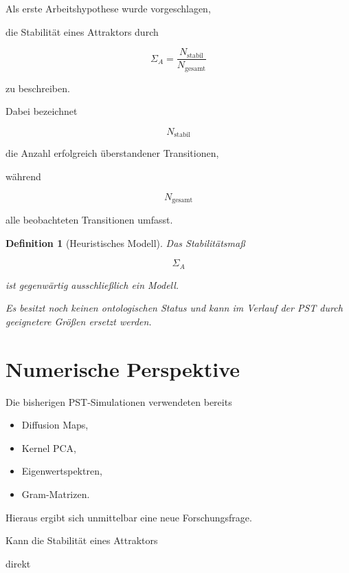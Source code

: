 \documentclass[11pt,a4paper]{article}
\newtheorem{definition}{Definition}
\begin{document}
Als erste Arbeitshypothese wurde vorgeschlagen,

die Stabilität eines Attraktors durch

\[
\Sigma_A
=
\frac
{N_{\mathrm{stabil}}}
{N_{\mathrm{gesamt}}}
\]

zu beschreiben.

Dabei bezeichnet

\[
N_{\mathrm{stabil}}
\]

die Anzahl erfolgreich überstandener Transitionen,

während

\[
N_{\mathrm{gesamt}}
\]

alle beobachteten Transitionen umfasst.

\begin{definition}[Heuristisches Modell]

Das Stabilitätsmaß

\[
\Sigma_A
\]

ist gegenwärtig ausschließlich
ein Modell.

Es besitzt noch keinen ontologischen Status
und kann im Verlauf der PST
durch geeignetere Größen ersetzt werden.

\end{definition}

\section{Numerische Perspektive}

Die bisherigen PST-Simulationen verwendeten bereits

\begin{itemize}

\item Diffusion Maps,

\item Kernel PCA,

\item Eigenwertspektren,

\item Gram-Matrizen.

\end{itemize}

Hieraus ergibt sich unmittelbar
eine neue Forschungsfrage.

Kann die Stabilität eines Attraktors

direkt
\end{document}
